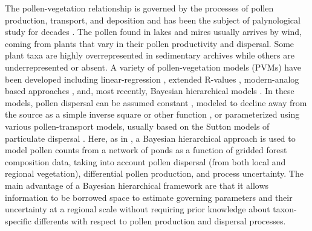 \documentclass[12pt]{article}
\begin{document}
The pollen-vegetation relationship is governed by the processes of
pollen production, transport, and deposition and has been the subject
of palynological study for decades \citep{tauber1965,
  jacobson1981selection, jackson1994pollen, jackson1999pollen,
  sugita2007theory1, sugita2007theory2, prentice1988records}. The
pollen found in lakes and mires usually arrives by wind, coming from
plants that vary in their pollen productivity and dispersal. Some
plant taxa are highly overrepresented in sedimentary archives while
others are underrepresented or absent. A variety of pollen-vegetation
models (PVMs) have been developed including linear-regression
\citep{webb1981estimating, bradshaw1985relationships}, extended
R-values \citep{parsons1981statistical, sugita1994pollen,
  sugita2007theory1, sugita2007theory2}, modern-analog based
approaches \citep{overpeck1985quantitative, williams2003variations},
and, most recently, Bayesian hierarchical models
\citep{paciorek2009mapping, garreta2010method}.  In these models,
pollen dispersal can be assumed constant \citep{davis1963theory,
  parsons1981statistical}, modeled to decline away from the source as
a simple inverse square or other function \citep{webb1981estimating,
  calcote1995pollen, jackson1998quantitative}, or parameterized using
various pollen-transport models, usually based on the Sutton models of
particulate dispersal \citep{prentice1988records, sugita2007theory1,
  sugita2007theory2, jackson1999pollen}. Here, as in
\citet{paciorek2009mapping}, a Bayesian hierarchical approach is used
to model pollen counts from a network of ponds as a function of
gridded forest composition data, taking into account pollen dispersal
(from both local and regional vegetation), differential pollen
production, and process uncertainty. The main advantage of a Bayesian
hierarchical framework are that it allows information to be borrowed
space to estimate governing parameters and their uncertainty at a
regional scale without requiring prior knowledge about taxon-specific
differents with respect to pollen production and dispersal processes.

\end{document}
